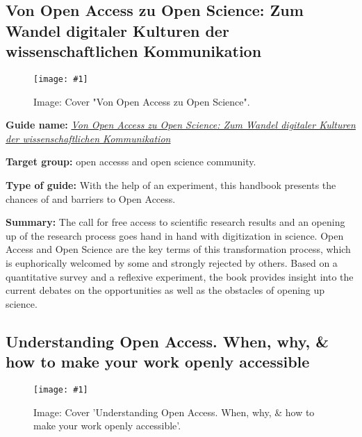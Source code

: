 \documentclass{article}
\newlength{\imgwidth}
\newcommand\scaledgraphics[2]{%
                
\settowidth{\imgwidth}{\texttt{[image: \#1]}}%
                
\setlength{\imgwidth}{\minof{\imgwidth}{#2\textwidth}}%
                
\texttt{[image: \#1]}%
                
}
\begin{document}
\subsection{Von Open Access zu Open Science: Zum Wandel digitaler Kulturen der wissenschaftlichen Kommunikation}\label{H9740541}



\begin{center}
\begin{figure}
\scaledgraphics{499c4719-8346-4a67-8a5b-fcacfb0ecde0.png}{0.5}
\caption*{Image: Cover "Von Open Access zu Open Science".}\label{F14991031}
\end{figure}


\end{center}


\textbf{Guide name:} \emph{\href{https://meson.press/wp-content/uploads/2018/01/978-3-95796-131-0-Heise-Open-Access-Open-Science.pdf}{Von Open Access zu Open Science: Zum Wandel digitaler Kulturen der wissenschaftlichen Kommunikation}} \autocite{heise_von_2018}


\textbf{Target group: }open accesss and open science community.


\textbf{Type of guide: }With the help of an experiment, this handbook presents the chances of and barriers to Open Access.


\textbf{Summary: } The call for free access to scientific research results and an opening up of the research process goes hand in hand with digitization in science. Open Access and Open Science are the key terms of this transformation process, which is euphorically welcomed by some and strongly rejected by others. Based on a quantitative survey and a reflexive experiment, the book provides insight into the current debates on the opportunities as well as the obstacles of opening up science.


\subsection{Understanding Open Access. When, why, \& how to make your work openly accessible}\label{H1144211}



\begin{center}
\begin{figure}
\scaledgraphics{37cc2dfd-e350-4e29-acc3-9c7f815eb133.png}{0.5}
\caption*{Image: Cover 'Understanding Open Access. When, why, \& how to make your work openly accessible'.}\label{F36070241}
\end{figure}


\end{center}
\end{document}
